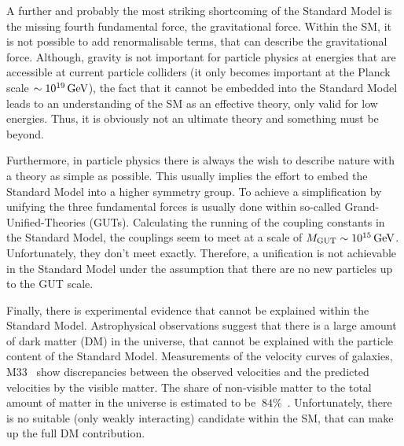  


A further and probably the most striking shortcoming of the Standard Model is the missing fourth fundamental force, the gravitational force.
Within the SM, it is not possible to add renormalisable terms, that can describe the gravitational force.
Although, gravity is not important for particle physics at energies that are accessible at current particle colliders (it only becomes important at the Planck scale $\sim 10^{19}\,\text{Ge}\kern-0.06667em\text{V}$), the fact that it cannot be embedded into the Standard Model leads to an understanding of the SM as an effective theory, only valid for low energies.
Thus, it is obviously not an ultimate theory and something must be beyond.

Furthermore, in particle physics there is always the wish to describe nature with a theory as simple as possible.
This usually implies the effort to embed the Standard Model into a higher symmetry group.
To achieve a simplification by unifying the three fundamental forces is usually done within so-called Grand-Unified-Theories (GUTs).
Calculating the running of the coupling constants in the Standard Model, the couplings seem to meet at a scale of $M_{\text{GUT}} \sim 10^{15}\,\text{Ge}\kern-0.06667em\text{V}$.
Unfortunately, they don't meet exactly.
Therefore, a unification is not achievable in the Standard Model under the assumption that there are no new particles up to the GUT scale.


Finally, there is experimental evidence that cannot be explained within the Standard Model.
Astrophysical observations suggest that there is a large amount of dark matter (DM) in the universe, that cannot be explained with the particle content of the Standard Model.
Measurements of the velocity curves of galaxies, \eg M33~\cite{bib:DM:RotationCurves} show discrepancies between the observed velocities and the predicted velocities by the visible matter.
The share of non-visible matter to the total amount of matter in the universe is estimated to be $~84\%$~\cite{bib:Planck_2015}.
Unfortunately, there is no suitable (only weakly interacting) candidate within the SM, that can make up the full DM contribution.\\



